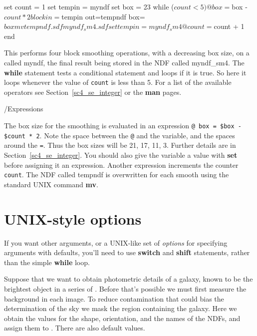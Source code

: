 \documentclass[twoside,11pt,nolof]{starlink}
\providecommand{\latexelsehtml}[2]{#1}
\providecommand{\NDFrefa}[1]{\xref{#1}{sun33}{}}
\begin{document}
\begin{small}
\begin{terminalv}
     set count = 1
     set tempin = myndf
     set box = 23
     while ($count < 5)
        @ box = $box - $count * 2
        block in=$tempin out=tempndf box=$box
        mv tempndf.sdf myndf_sm4.sdf
        set tempin = myndf_sm4
        @ count = $count + 1
     end
\end{terminalv}
\end{small}
This performs four block smoothing operations, with a decreasing box
size, on a \NDFrefa{\textsf{NDF}} called myndf, the final result being
stored in the NDF called myndf\_sm4.  The \textbf{while} statement tests
a conditional statement and loops if it is true.  So here it loops
whenever the value of \texttt{count} is less than 5.
\latexelsehtml{For a list of the available operators
see Section~\ref{sc4_se_integer} or the \textbf{man}
pages.}{Click \htmlref{here}{sc4_se_integer} to see examples of other
operators.}

\begin{small}
\begin{terminalv}
     /Expressions
\end{terminalv}
\end{small}

The box size for the smoothing is evaluated in an expression
\mbox{\texttt{@ box = \$box - \$count * 2}}.  Note the space between the
\texttt{@} and the variable, and the spaces around the \texttt{=}.  Thus
the box sizes will be 21, 17, 11, 3.  Further details are
\latexelsehtml{in
Section~\ref{sc4_se_integer}.}{\htmlref{here}{sc4_se_integer}.}
You should also give the variable a value with \textbf{set} before
assigning it an expression.  Another expression increments the counter
\texttt{count}.  The NDF called tempndf is overwritten for each smooth
using the standard UNIX command \textbf{mv}.

\newpage
\section{UNIX-style options
\label{sc4_se_unix_options}}

If you want other arguments, or a UNIX-like set of \emph{options\/}
for specifying arguments with defaults, you'll need to use \textbf{switch}
and \textbf{shift} statements, rather than the simple \textbf{while} loop.

Suppose that we want to obtain photometric details of a galaxy, known
to be the brightest object in a series of \NDFrefa{\textsf{NDF}s}.  Before
that's possible we must first measure the background in each image.
To reduce contamination that could bias the determination of the sky
we mask the region containing the galaxy.  Here we obtain the values
for the shape, orientation, and the names of the NDFs, and assign them
to .  There are also default values.
\end{document}
